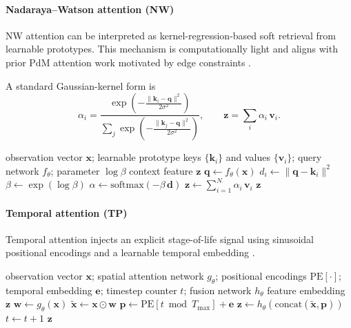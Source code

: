 \documentclass[sn-basic]{sn-jnl} %
\begin{document}
\paragraph{Nadaraya--Watson attention (NW)}
NW attention can be interpreted as kernel-regression-based soft retrieval from learnable prototypes. This mechanism is computationally light and aligns with prior PdM attention work motivated by edge constraints \cite{Siraskar2024}.

A standard Gaussian-kernel form is
\begin{equation}
\alpha_i = \frac{\exp\left(-\tfrac{\lVert \mathbf{k}_i-\mathbf{q}\rVert^2}{2\sigma^2}\right)}{\sum_j \exp\left(-\tfrac{\lVert \mathbf{k}_j-\mathbf{q}\rVert^2}{2\sigma^2}\right)},
\qquad \mathbf{z}=\sum_i\alpha_i\,\mathbf{v}_i.
\end{equation}

\begin{algorithm}[t]
\caption{NW attention feature extractor (forward pass)}
\label{alg:nw_forward}
\begin{algorithmic}[1]
\Require observation vector $\mathbf{x}$; learnable prototype keys $\{\mathbf{k}_i\}$ and values $\{\mathbf{v}_i\}$; query network $f_\theta$; parameter $\log\beta$
\Ensure context feature $\mathbf{z}$
\State $\mathbf{q} \gets f_\theta(\mathbf{x})$ 
		\State $d_i \gets \lVert \mathbf{q}-\mathbf{k}_i\rVert^2$
\EndFor
\State $\beta \gets \exp(\log\beta)$ 
\State $\alpha \gets \mathrm{softmax}(-\beta\,\mathbf{d})$ 
\State $\mathbf{z} \gets \sum_{i=1}^{N} \alpha_i\,\mathbf{v}_i$
\State \Return $\mathbf{z}$
\end{algorithmic}
\end{algorithm}

\paragraph{Temporal attention (TP)}
Temporal attention injects an explicit stage-of-life signal using sinusoidal positional encodings and a learnable temporal embedding \cite{Vaswani2017}.

\begin{algorithm}[t]
\caption{Temporal attention feature extractor (forward pass)}
\label{alg:tp_forward}
\begin{algorithmic}[1]
\Require observation vector $\mathbf{x}$; spatial attention network $g_\theta$; positional encodings $\mathrm{PE}[\cdot]$; temporal embedding $\mathbf{e}$; timestep counter $t$; fusion network $h_\theta$
\Ensure feature embedding $\mathbf{z}$
\State $\mathbf{w} \gets g_\theta(\mathbf{x})$ 
\State $\tilde{\mathbf{x}} \gets \mathbf{x} \odot \mathbf{w}$
\State $\mathbf{p} \gets \mathrm{PE}[t \bmod T_{\max}] + \mathbf{e}$
\State $\mathbf{z} \gets h_\theta(\mathrm{concat}(\tilde{\mathbf{x}},\mathbf{p}))$
\State $t \gets t+1$
\State \Return $\mathbf{z}$
\end{algorithmic}
\end{algorithm}
\end{document}
